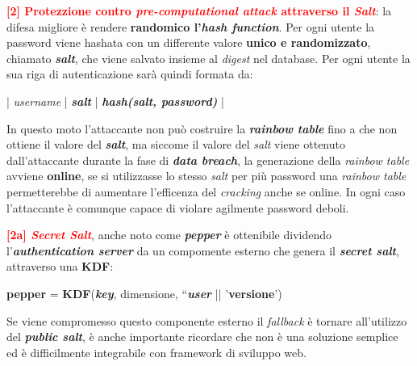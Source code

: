 \begin{flushleft}
    \textcolor{red}{\textbf{[2] Protezzione contro \textit{pre-computational attack} attraverso il \textit{Salt}}}: la difesa migliore è rendere \textbf{randomico l'\textit{hash function}}. Per ogni utente la password viene hashata con un differente valore \textbf{unico e randomizzato}, chiamato \textbf{\textit{salt}}, che viene salvato insieme al \textit{digest} nel database. Per ogni utente la sua riga di autenticazione sarà quindi formata da: 
    
    {\centering
        | \textit{username} | \textbf{\textit{salt}} | \textbf{\textit{hash(salt, password)}} |
    \par}

    In questo moto l'attaccante non può costruire la \textbf{\textit{rainbow table}} fino a che non ottiene il valore del \textbf{\textit{salt}}, ma siccome il valore del \textit{salt} viene ottenuto dall'attaccante durante la fase di \textbf{\textit{data breach}}, la generazione della \textit{rainbow table} avviene \textbf{online}, se si utilizzasse lo stesso \textit{salt} per più password una \textit{rainbow table} permetterebbe di aumentare l'efficenza del \textit{cracking} anche se online. In ogni caso l'attaccante è comunque capace di violare agilmente password deboli.

    \smallskip

    \textcolor{red}{\textbf{[2a] \textit{Secret Salt}}}, anche noto come \textbf{\textit{pepper}} è ottenibile dividendo l'\textbf{\textit{authentication server}} da un compomente esterno che genera il \textbf{\textit{secret salt}}, attraverso una \textbf{KDF}:

    {\centering
        \textbf{pepper} = \textbf{KDF}(\textbf{\textit{key}}, dimensione, ``\textbf{\textit{user}} || '\textbf{versione}')
    \par}
    
    Se viene compromesso questo componente esterno il \textit{fallback} è tornare all'utilizzo del \textbf{\textit{public salt}}, è anche importante ricordare che non è una soluzione semplice ed è difficilmente integrabile con framework di sviluppo web.

    \smallskip


\end{flushleft}
